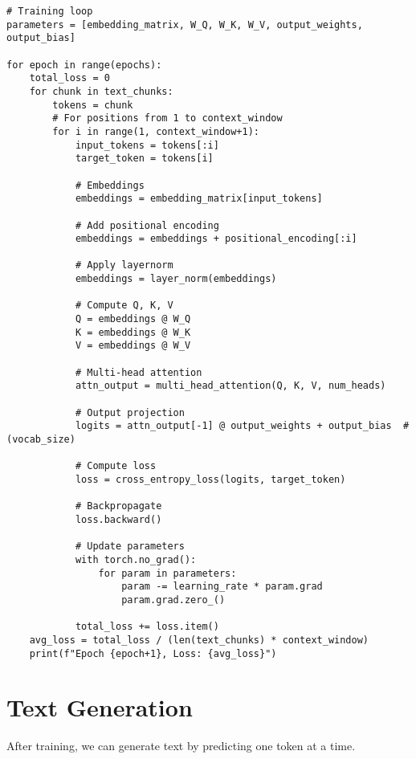 \documentclass{article}
\begin{document}
\begin{lstlisting}[style=pythonstyle]
# Training loop
parameters = [embedding_matrix, W_Q, W_K, W_V, output_weights, output_bias]

for epoch in range(epochs):
    total_loss = 0
    for chunk in text_chunks:
        tokens = chunk
        # For positions from 1 to context_window
        for i in range(1, context_window+1):
            input_tokens = tokens[:i]
            target_token = tokens[i]

            # Embeddings
            embeddings = embedding_matrix[input_tokens]

            # Add positional encoding
            embeddings = embeddings + positional_encoding[:i]

            # Apply layernorm
            embeddings = layer_norm(embeddings)

            # Compute Q, K, V
            Q = embeddings @ W_Q
            K = embeddings @ W_K
            V = embeddings @ W_V

            # Multi-head attention
            attn_output = multi_head_attention(Q, K, V, num_heads)

            # Output projection
            logits = attn_output[-1] @ output_weights + output_bias  # (vocab_size)

            # Compute loss
            loss = cross_entropy_loss(logits, target_token)

            # Backpropagate
            loss.backward()

            # Update parameters
            with torch.no_grad():
                for param in parameters:
                    param -= learning_rate * param.grad
                    param.grad.zero_()

            total_loss += loss.item()
    avg_loss = total_loss / (len(text_chunks) * context_window)
    print(f"Epoch {epoch+1}, Loss: {avg_loss}")
\end{lstlisting}

\section{Text Generation}

After training, we can generate text by predicting one token at a time.
\end{document}

